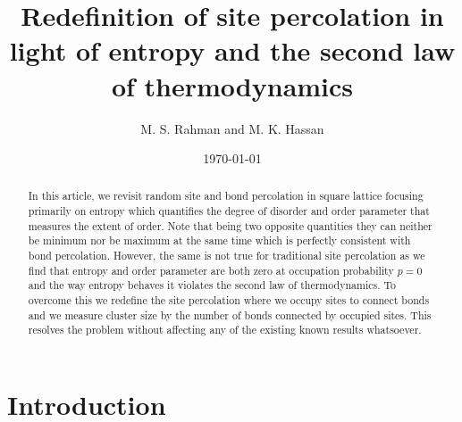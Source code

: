 \documentclass[twocolumn,showpacs,preprintnumbers,amsmath,amssymb]{article}
\begin{document}
\title{Redefinition of site percolation in light of entropy and the second law of thermodynamics  
}%

\author{ M. S. Rahman and M. K. Hassan 
}%
\date{\today}%


\begin{abstract}
In this article, we revisit random site and bond percolation in square lattice focusing primarily 
on entropy which quantifies the degree of disorder and order parameter
that measures the extent of order. Note that being two opposite quantities they can neither be
minimum nor be maximum at the same time which is perfectly consistent 
with bond percolation. However, the same is  not true for traditional site
percolation as we find that entropy and order parameter are both zero at occupation 
probability $p=0$ and the way entropy behaves it violates the second law of thermodynamics. To overcome this we redefine the site percolation 
where we occupy sites to connect bonds and we measure cluster size by the number of bonds connected by occupied sites. 
This resolves the problem without affecting any of the existing known results whatsoever.
\end{abstract}


\maketitle

\section{Introduction}
\end{document}
